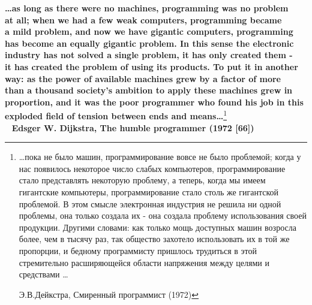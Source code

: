 \begin{flushright} 
\textbf{\dots as long as there were no machines, programming was no problem \\ at all; when we had a few weak computers, programming became \\ a mild problem, and now we have gigantic computers, programming\\ has become an equally gigantic problem. In this sense the electronic\\ industry has not solved a single problem, it has only created them - \\ it has created the problem of using its products. To put it in another\\ way:  as the power of available machines grew by a factor of more\\ than a thousand society's ambition to apply these machines grew in\\ proportion, and it was the poor programmer who found his job in this\\ exploded field of tension between ends and means\dots}\footnote{\dots пока не было машин, программирование вовсе не было проблемой; когда у нас появилось некоторое число слабых компьютеров, программирование стало представлять некоторую проблему, а теперь, когда мы имеем гигантские компьютеры, программирование стало столь же гигантской проблемой. В этом смысле электронная индустрия не решила ни одной проблемы, она только создала их - она создала проблему использования своей продукции. Другими словами: как только мощь доступных машин возросла более, чем в тысячу раз, так общество захотело использовать их в той же пропорции, и бедному программисту пришлось трудиться в этой стремительно расширяющейся области напряжения между целями и средствами \dots

                                                                     Э.В.Дейкстра, Смиренный программист (1972)}
\\
\ \newline
\textbf{Edsger W. Dijkstra, The humble programmer (1972 [66])}
\end{flushright}

